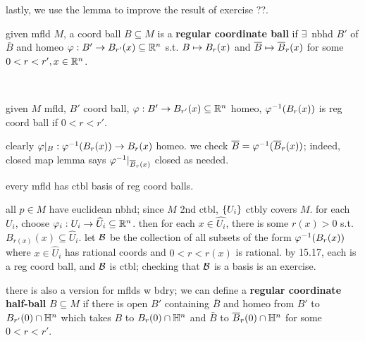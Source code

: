 lastly, we use the lemma to improve the result of exercise ??.

\begin{defn}
    given mfld $M$, a coord ball $B\subseteq M$ is
    a \textbf{regular coordinate ball} if $\exists \, $ nbhd $B'$ of $\bar{B}$
    and homeo $\varphi:B'\rightarrow B_{r'}(x)\subseteq\mathbb{R}^{n}$ s.t.
    $B\mapsto B_{r}(x)$ and $\overline{B}\mapsto\overline{B}_{r}(x)$ for some
    $0<r<r',x\in\mathbb{R}^{n}$.
\end{defn} \ %

\begin{lm}
    given $M$ mfld, $B'$ coord ball, $\varphi:B'\rightarrow B_{r'}(x)\subseteq\mathbb{R}^{n}$
    homeo, $\varphi^{-1}(B_{r}(x))$ is reg coord ball if $0<r<r'$.
\end{lm}

\begin{pf}[source=Primary Source Material]
    clearly $\varphi\rvert_{B}:\varphi^{-1}(B_{r}(x))\rightarrow B_{r}(x)$ homeo.
    we check $\overline{B}=\varphi^{-1}(\overline{B}_{r}(x))$; indeed,
    closed map lemma says $\varphi^{-1}\rvert_{\overline{B}_{r}(x)}$ closed as needed.
\end{pf}

\newpage
\begin{prop}
    every mfld has ctbl basis of reg coord balls.
\end{prop}

\begin{pf}[source=Primary Source Material]
    all $p\in M$ have euclidean nbhd; since $M$ 2nd ctbl,
    $\left\{{U_{i}}\right\}$ ctbly covers $M$.
    for each $U_{i}$, choose $\varphi_{i}:U_{i}\rightarrow\widehat{U}_{i}\subseteq\mathbb{R}^{n}$.
    then for each $x\in\hat{U_{i}}$, there is some $r(x)>0$ s.t.
    $B_{r(x)}(x)\subseteq\hat{U}_{i}$.
    let $\mathcal{B}$ be the collection of all subsets of the form
    $\varphi^{-1}(B_{r}(x))$ where $x\in\hat{U}_{i}$ has rational coords and
    $0<r<r(x)$ is rational.
    by 15.17, each is a reg coord ball, and $\mathcal{B}$ is ctbl;
    checking that $\mathcal{B}$ is a basis is an exercise.
\end{pf}
there is also a version for mflds w bdry;
we can define a \textbf{regular coordinate half-ball} $B\subseteq M$ if there is
open $B'$ containing $\bar{B}$ and homeo from $B'$ to $B_{r'}(0)\cap\mathbb{H}^{n}$
which takes $B$ to $B_{r}(0)\cap\mathbb{H}^{n}$ and $\bar{B}$ to
$\overline{B}_{r}(0)\cap\mathbb{H}^{n}$ for some $0<r<r'$.

